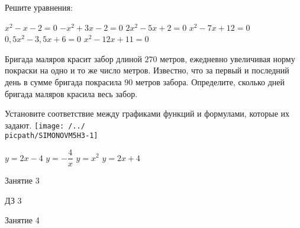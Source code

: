 \begin{homework}[number=2]
	\begin{listofex}
		\item Решите уравнения:
		\begin{tasks}
			\task \( x^2-x-2=0 \)
			\task \( -x^2+3x-2=0 \)
			\task \( 2x^2-5x+2=0 \)
			\task \( x^2-7x+12=0 \)
			\task \( 0,5x^2-3,5x+6=0 \)
			\task \( x^2-12x+11=0 \)
		\end{tasks}
		\item  Бригада маляров красит забор длиной \(270\) метров, ежедневно увеличивая норму покраски на одно и то же число метров. Известно, что за первый и последний день в сумме бригада покрасила \(90\) метров забора. Определите, сколько дней бригада маляров красила весь забор.
		\item Установите соответствие между графиками функций и формулами, которые их задают.
		\texttt{[image: /../\\picpath/SIMONOVM5H3-1]}
		\begin{tasks}
			\task \(y=2x-4\)
			\task \(y=-\dfrac{4}{x}\)
			\task \(y=x^2\)
			\task \(y=2x+4\)
		\end{tasks}
	\end{listofex}
\end{homework}

\begin{class}[number=3]
	\begin{listofex}
		\item Занятие 3
	\end{listofex}
\end{class}

\begin{homework}[number=3]
	\begin{listofex}
		\item ДЗ 3
	\end{listofex}
\end{homework}

\begin{class}[number=4]
	\begin{listofex}
		\item Занятие 4
	\end{listofex}
\end{class}
